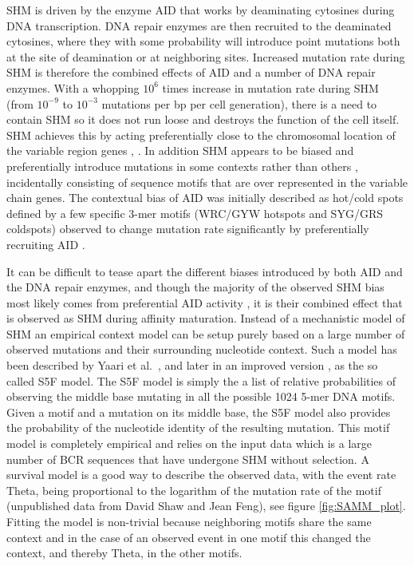 SHM is driven by the enzyme AID that works by deaminating cytosines during DNA transcription.
DNA repair enzymes are then recruited to the deaminated cytosines, where they with some probability will introduce point mutations both at the site of deamination or at neighboring sites.
Increased mutation rate during SHM is therefore the combined effects of AID and a number of DNA repair enzymes.
With a whopping $10^6$ times increase in mutation rate during SHM (from $10^{-9}$ to $10^{-3}$ mutations per bp per cell generation), there is a need to contain SHM so it does not run loose and destroys the function of the cell itself.
SHM achieves this by acting preferentially close to the chromosomal location of the variable region genes \cite{Yeap_2015}, \cite{liu2008two}.
In addition SHM appears to be biased and preferentially introduce mutations in some contexts rather than others \cite{Yeap_2015}, incidentally consisting of sequence motifs that are over represented in the variable chain genes.
The contextual bias of AID was initially described as hot/cold spots defined by a few specific 3-mer motifs (WRC/GYW hotspots and SYG/GRS coldspots) observed to change mutation rate significantly by preferentially recruiting AID \cite{pham2003processive}.

It can be difficult to tease apart the different biases introduced by both AID and the DNA repair enzymes, and though the majority of the observed SHM bias most likely comes from preferential AID activity \cite{Pham_2016}, it is their combined effect that is observed as SHM during affinity maturation.
Instead of a mechanistic model of SHM an empirical context model can be setup purely based on a large number of observed mutations and their surrounding nucleotide context.
Such a model has been described by Yaari et al.\ \cite{yaari2013models}, and later in an improved version \cite{cui2016model}, as the so called S5F model.
The S5F model is simply the a list of relative probabilities of observing the middle base mutating in all the possible 1024 5-mer DNA motifs.
Given a motif and a mutation on its middle base, the S5F model also provides the probability of the nucleotide identity of the resulting mutation.
This motif model is completely empirical and relies on the input data which is a large number of BCR sequences that have undergone SHM without selection.
A survival model \cite{cox1992regression} is a good way to describe the observed data, with the event rate Theta, being proportional to the logarithm of the mutation rate of the motif (unpublished data from David Shaw and Jean Feng), see figure \ref{fig:SAMM_plot}.
Fitting the model is non-trivial because neighboring motifs share the same context and in the case of an observed event in one motif this changed the context, and thereby Theta, in the other motifs.

